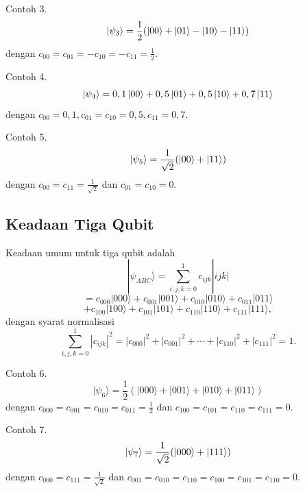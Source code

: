 Contoh 3.
\begin{equation}
	\ket{\psi_3}=\frac{1}{2}(\ket{00}+\ket{01}-\ket{10}-\ket{11}) \label{contoh3}
\end{equation}
dengan $c_{00}=c_{01}=-c_{10}=-c_{11}=\frac{1}{2}$.

Contoh 4.
\begin{equation}
	\ket{\psi_4}=0,1\ket{00}+0,5\ket{01}+0,5\ket{10}+0,7\ket{11} \label{contoh4}
\end{equation}
dengan $c_{00}=0,1, c_{01}=c_{10}=0,5, c_{11}=0,7$.

Contoh 5.
\begin{equation}
	\ket{\psi_5}=\frac{1}{\sqrt{2}}(\ket{00}+\ket{11}) \label{contoh5}
\end{equation}
dengan $c_{00}=c_{11}=\frac{1}{\sqrt{2}}$ dan $c_{01}=c_{10}=0$.

\subsection{Keadaan Tiga Qubit}
Keadaan umum untuk tiga qubit adalah
\begin{equation}
	|\psi_{ABC}\rangle = \sum_{i,j,k=0}^{1}c_{ijk} |ijk|\label{keadaan3qubit}
\end{equation}
\begin{equation*}
	=c_{000} |000\rangle
	+ c_{001} |001\rangle
	+ c_{010} |010\rangle
	+ c_{011} |011\rangle
\end{equation*}
\begin{equation*}
	+ c_{100} |100\rangle
	+ c_{101} |101\rangle
	+ c_{110} |110\rangle
	+ c_{111} |111\rangle ,
\end{equation*}
dengan syarat normalisasi
\begin{equation}
	\sum_{i,j,k=0}^{1} |c_{ijk}|^2 = |c_{000}|^2 + |c_{001}|^2 + \cdots + |c_{110}|^2 + |c_{111}|^2 = 1.\label{normalisasi3qubit}
\end{equation}

Contoh 6.
\begin{equation}
	|\psi_6\rangle =
	\frac{1}{2}
	\left(
	|000\rangle + |001\rangle + |010\rangle + |011\rangle
	\right)\label{contohkeadaan3qubit}
\end{equation}
dengan $c_{000}=c_{001}=c_{010}=c_{011}=\frac{1}{2}$ dan $c_{100}=c_{101}=c_{110}=c_{111}=0$.

Contoh 7.
\begin{equation}
	\ket{\psi_7}=\frac{1}{\sqrt{2}}(\ket{000}+\ket{111})\label{contohkeadaan3qubitkedua}
\end{equation}
dengan $c_{000}=c_{111}=\frac{1}{\sqrt{2}}$ dan $c_{001}=c_{010}=c_{110}=c_{100}=c_{101}=c_{110}=0$.

